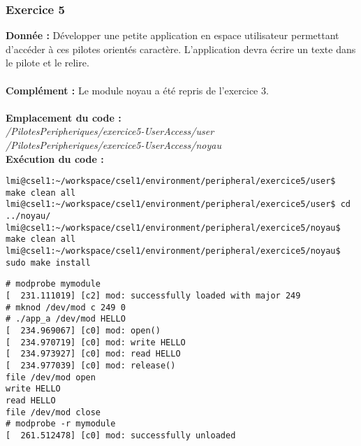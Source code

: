 \subsubsection{Exercice 5}
\textbf{Donnée : } Développer	une	petite	application	en	espace	utilisateur	permettant	d’accéder	à	ces	pilotes	
orientés	caractère.	L’application	devra	écrire	un	texte	dans	le	pilote	et	le	relire.\\\\
\textbf{Complément : } Le module noyau a été repris de l'exercice 3.\\\\
\textbf{Emplacement du code : }\\ \textit{/PilotesPeripheriques/exercice5-UserAccess/user}\\
\textit{/PilotesPeripheriques/exercice5-UserAccess/noyau}\\

\textbf{Exécution du code : } \\
\begin{lstlisting}
lmi@csel1:~/workspace/csel1/environment/peripheral/exercice5/user$ make clean all
lmi@csel1:~/workspace/csel1/environment/peripheral/exercice5/user$ cd ../noyau/
lmi@csel1:~/workspace/csel1/environment/peripheral/exercice5/noyau$ make clean all
lmi@csel1:~/workspace/csel1/environment/peripheral/exercice5/noyau$ sudo make install
\end{lstlisting}
\begin{lstlisting}
# modprobe mymodule                                                             
[  231.111019] [c2] mod: successfully loaded with major 249    
# mknod /dev/mod c 249 0                  
# ./app_a /dev/mod HELLO                                                        
[  234.969067] [c0] mod: open()                                                 
[  234.970719] [c0] mod: write HELLO                                            
[  234.973927] [c0] mod: read HELLO                                             
[  234.977039] [c0] mod: release()                                              
file /dev/mod open                                                              
write HELLO                                                                     
read HELLO                                                                      
file /dev/mod close                                                             
# modprobe -r mymodule                                                          
[  261.512478] [c0] mod: successfully unloaded
\end{lstlisting}

